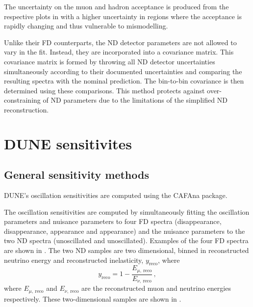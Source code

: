 The uncertainty on the muon and hadron acceptance is produced from the respective plots in  with a higher uncertainty in regions where the acceptance is rapidly changing and thus vulnerable to mismodelling.

Unlike their FD counterparts, the ND detector parameters are not allowed to vary in the fit.
Instead, they are incorporated into a covariance matrix.
This covariance matrix is formed by throwing all ND detector uncertainties simultaneously according to their documented uncertainties and comparing the resulting spectra with the nominal prediction.
The bin-to-bin covariance is then determined using these comparisons.
This method protects against over-constraining of ND parameters due to the limitations of the simplified ND reconstruction.

\section{DUNE sensitivites}
\label{sec:dune_lbl:sensitivities}

\subsection{General sensitivity methods}
\label{sec:dune_lbl:sensitivities:general}

DUNE's oscillation sensitivities are computed using the CAFAna package.

The oscillation sensitivities are computed by simultaneously fitting the oscillation parameters and nuisance parameters to four FD spectra (\numu disappearance, \anumu disappearance, \nue appearance and \anue appearance) and the nuisance parameters to the two ND spectra (\numu unoscillated and \anumu unoscillated).
Examples of the four FD spectra are shown in .
The two ND samples are two dimensional, binned in reconstructed neutrino energy and reconstructed inelasticity, $y_{\text{reco}}$, where
\begin{equation}
	y_{\text{reco}} = 1 - \frac{E_{\mu,~\text{reco}}}{E_{\nu,~\text{reco}}} \, ,
\end{equation}
where $E_{\mu,~\text{reco}}$ and $E_{\nu,~\text{reco}}$ are the reconstructed muon and neutrino energies respectively.
These two-dimensional samples are shown in .

